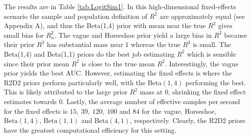\documentclass[12pt]{article}
\begin{document}
\begin{comment}
\begin{table}
    \centering
      \begin{tabular}{l|cccc}
        Prior & $R^2$ bias & $R^2$ MSE & AUC & $||\bbeta-\hat\bbeta||_2$ \\\hline
        Vague & 0.590 &0.590 &{\bf 0.326} &68.643\\
        Horseshoe &0.422 &0.425 &0.302 &15.174  \\
        &\vspace{-10pt}\\
        $R^2\sim\mbox{Beta}(1,4)$&{\bf -0.035} &{\bf 0.155} &0.325 &{\bf 2.619}\\
        $R^2\sim\mbox{Beta}(1,1)$&0.054 &0.181 &0.319 &4.452  \\
        $R^2\sim\mbox{Beta}(4,1)$&0.169 &0.219 &0.312 &7.873 \\\hline
        S.E. & 0.010 & 0.010 & 0.008 & 1.542
    \end{tabular}
    \caption{Simulation study results for Logistic regression with $n=60, p=50$, no random effects and mean$(R^2)=0.35$ and stdev$(R^2)=0.16$. Averaged over 200 repetitions. Largest standard errors are in the last row and lowest (absolute) value is in bold (largest for AUC).}
    \label{tab:LogitSim1}
\end{table}
\end{comment}


The results are in Table \ref{tab:LogitSim1}. In this high-dimensional fixed-effects scenario the sample and population definition of $R^2$ are approximately equal (see Appendix A), and thus the Beta(1,4) prior  with mean near the true $R^2$ gives small bias for $R_n^2$. The vague and Horseshoe prior yield a large bias in $R^2$ because their prior $R^2$ has substantial mass near 1 whereas the true $R^2$ is small. The Beta(1,4) and Beta(1,1) priors do the best job estimating $R^2$ which is sensible since their prior mean $R^2$ is close to the true mean $R^2$. Interestingly, the vague prior yields the best AUC. However, estimating the fixed effects is where the R2D2 priors perform particularly well, with the Beta$(1,4)$ performing the best. This is likely attributed to the large prior $R^2$ mass at 0, shrinking the fixed effect estimates towards 0. Lastly, the average number of effective samples per second for the fixed effects is $15,\ 39,\ 120,\ 100$ and $84$ for the vague, Horseshoe, $\mbox{Beta}(1,4)$, $\mbox{Beta}(1,1)$ and $\mbox{Beta}(4,1)$, respectively. Clearly, the R2D2 priors have the greatest computational efficiency for this setting.
\end{document}
